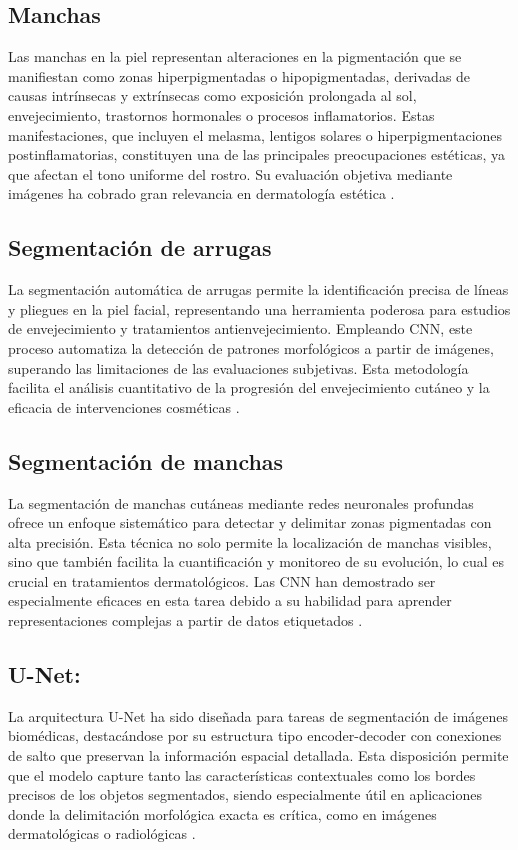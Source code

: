 \subsection{Manchas}
Las manchas en la piel representan alteraciones en la pigmentación que se manifiestan como zonas hiperpigmentadas o hipopigmentadas, derivadas de causas intrínsecas y extrínsecas como exposición prolongada al sol, envejecimiento, trastornos hormonales o procesos inflamatorios. Estas manifestaciones, que incluyen el melasma, lentigos solares o hiperpigmentaciones postinflamatorias, constituyen una de las principales preocupaciones estéticas, ya que afectan el tono uniforme del rostro. Su evaluación objetiva mediante imágenes ha cobrado gran relevancia en dermatología estética \parencite{autor2019manchas}.

\subsection{Segmentación de arrugas}  
La segmentación automática de arrugas permite la identificación precisa de líneas y pliegues en la piel facial, representando una herramienta poderosa para estudios de envejecimiento y tratamientos antienvejecimiento. Empleando CNN, este proceso automatiza la detección de patrones morfológicos a partir de imágenes, superando las limitaciones de las evaluaciones subjetivas. Esta metodología facilita el análisis cuantitativo de la progresión del envejecimiento cutáneo y la eficacia de intervenciones cosméticas \parencite{autor2020segmentacion}.

\subsection{Segmentación de manchas}  
La segmentación de manchas cutáneas mediante redes neuronales profundas ofrece un enfoque sistemático para detectar y delimitar zonas pigmentadas con alta precisión. Esta técnica no solo permite la localización de manchas visibles, sino que también facilita la cuantificación y monitoreo de su evolución, lo cual es crucial en tratamientos dermatológicos. Las CNN han demostrado ser especialmente eficaces en esta tarea debido a su habilidad para aprender representaciones complejas a partir de datos etiquetados \parencite{autor2020segmentacion}.

\subsection{U-Net:} 
La arquitectura U-Net ha sido diseñada para tareas de segmentación de imágenes biomédicas, destacándose por su estructura tipo encoder-decoder con conexiones de salto que preservan la información espacial detallada. Esta disposición permite que el modelo capture tanto las características contextuales como los bordes precisos de los objetos segmentados, siendo especialmente útil en aplicaciones donde la delimitación morfológica exacta es crítica, como en imágenes dermatológicas o radiológicas \parencite{ronneberger2015}.

